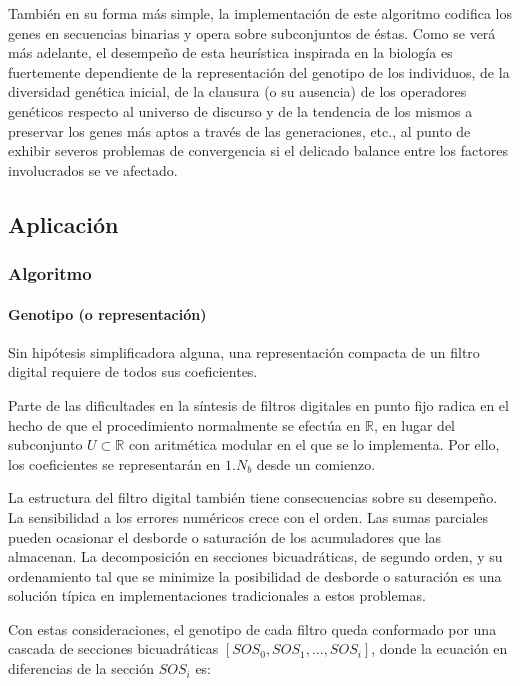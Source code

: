 \documentclass[11pt]{article}
\begin{document}
También en su forma más simple, la implementación de este algoritmo
codifica los genes en secuencias binarias y opera sobre subconjuntos de
éstas. Como se verá más adelante, el desempeño de esta heurística
inspirada en la biología es fuertemente dependiente de la representación
del genotipo de los individuos, de la diversidad genética inicial, de la
clausura (o su ausencia) de los operadores genéticos respecto al
universo de discurso y de la tendencia de los mismos a preservar los
genes más aptos a través de las generaciones, etc., al punto de exhibir
severos problemas de convergencia si el delicado balance entre los
factores involucrados se ve afectado.

    \subsection{Aplicación}\label{aplicaciuxf3n}

    \subsubsection{Algoritmo}\label{algoritmo}

\paragraph{Genotipo (o
representación)}\label{genotipo-o-representaciuxf3n}

Sin hipótesis simplificadora alguna, una representación compacta de un
filtro digital requiere de todos sus coeficientes.

Parte de las dificultades en la síntesis de filtros digitales en punto
fijo radica en el hecho de que el procedimiento normalmente se efectúa
en \(\mathbb{R}\), en lugar del subconjunto \(U \subset \mathbb{R}\) con
aritmética modular en el que se lo implementa. Por ello, los
coeficientes se representarán en \(1.N_b\) desde un comienzo.

La estructura del filtro digital también tiene consecuencias sobre su
desempeño. La sensibilidad a los errores numéricos crece con el orden.
Las sumas parciales pueden ocasionar el desborde o saturación de los
acumuladores que las almacenan. La decomposición en secciones
bicuadráticas, de segundo orden, y su ordenamiento tal que se minimize
la posibilidad de desborde o saturación es una solución típica en
implementaciones tradicionales a estos problemas.

Con estas consideraciones, el genotipo de cada filtro queda conformado
por una cascada de secciones bicuadráticas
\([SOS_0, SOS_1, ..., SOS_i]\), donde la ecuación en diferencias de la
sección \(SOS_i\) es:
\end{document}
